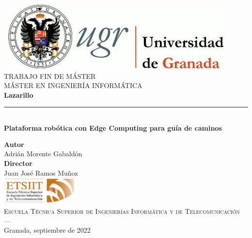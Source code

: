 \begin{titlepage}

\newlength{\centeroffset}
\setlength{\centeroffset}{-0.5\oddsidemargin}
\addtolength{\centeroffset}{0.5\evensidemargin}
\thispagestyle{empty}

\noindent\hspace*{\centeroffset}\begin{minipage}{\textwidth}

\centering
\includegraphics[width=0.9\textwidth]{imagenes/logo_ugr.jpg}\\[1.4cm]

\textsc{\Large TRABAJO FIN DE MÁSTER\\[0.2cm]}
\textsc{MÁSTER EN INGENIERÍA INFORMÁTICA}\\[1cm]
% 
{\Huge\bfseries Lazarillo\\
}
\noindent\rule[-1ex]{\textwidth}{3pt}\\[3.5ex]
{\large\bfseries Plataforma robótica con Edge Computing para guía de caminos}
\end{minipage}

\vspace{2.5cm}
\noindent\hspace*{\centeroffset}\begin{minipage}{\textwidth}
\centering

\textbf{Autor}\\ {Adrián Morente Gabaldón}\\[2.5ex]
\textbf{Director}\\
{Juan José Ramos Muñoz}\\[2cm]
\includegraphics[width=0.3\textwidth]{imagenes/etsiit_logo.png}\\[0.1cm]
\textsc{Escuela Técnica Superior de Ingenierías Informática y de Telecomunicación}\\
\textsc{---}\\
Granada, septiembre de 2022
\end{minipage}
\end{titlepage}
